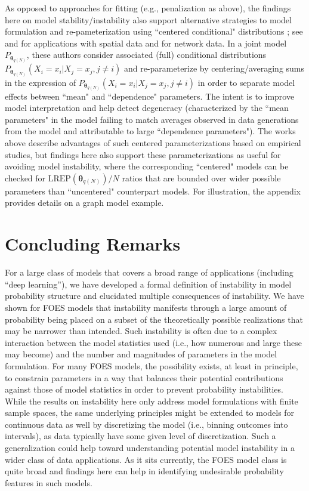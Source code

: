 \documentclass[numbib]{imamat}
\theoremstyle{theorem}
\theoremstyle{lemma}
\theoremstyle{example}
\theoremstyle{corollary}
\theoremstyle{definition}
\theoremstyle{remark}
\theoremstyle{approximation}
\theoremstyle{scheme}
\newcommand{\REP}{\mathrm{LREP}}
\newcommand{\thetaidx}{q(N)}
\newcommand{\thetaN}{\boldsymbol \theta_{\thetaidx}}
\newcommand{\ak}[1]{{\color{blue} #1}}
\begin{document}
{As opposed to approaches for fitting (e.g., penalization as above),  the findings here on model stability/instability also support alternative strategies to model formulation and re-pameterization using ``centered conditional" distributions \citep[cf.][]{kaiser2007statistical}; see \citet{kaiser2009exploring} and \citet{kaiser2012centered} for applications with spatial data and \citet{casleton2017local} for network data. In a joint model $P_{\thetaN}$,  these authors consider associated (full) conditional distributions $P_{\thetaN}(X_{i} = x_i | X_j=x_j, j\neq i)$ and re-parameterize by centering/averaging sums in the expression of  $P_{\thetaN}(X_{i} = x_i | X_j=x_j, j\neq i)$ in order to separate model effects between ``mean" and ``dependence" parameters.  The intent is to improve model interpretation and help detect degeneracy (characterized by the ``mean parameters" in the model failing to match averages observed in data generations from the model and attributable to large ``dependence parameters"). The works above describe advantages of such centered parameterizations based on empirical studies, but findings here also support these parameterizations as useful for avoiding model instability, where the corresponding ``centered" models can be checked for $\REP(\thetaN)/N$ ratios that are bounded over wider possible parameters than ``uncentered" counterpart models.  For illustration, the appendix provides details on a graph model example.}

\hypertarget{conclusions}{%
\section{Concluding Remarks}\label{conclusions}}

For a large class of models that covers a broad range of applications (including ``deep learning''), we have developed a formal definition of instability in model probability structure and elucidated multiple consequences of instability. We have shown for FOES models that instability manifests through \ak{a large amount of probability being placed on a subset of the theoretically possible realizations that may be narrower than intended.}
Such instability is often due to a complex interaction between the model statistics used (i.e., how numerous and large these may become) and the number and magnitudes of parameters in the model formulation. For many FOES models, the possibility exists, at least in principle, to \ak{constrain} parameters in a way \ak{that} balances their potential contributions against those of model statistics in order to prevent probability instabilities. \ak{While the results on instability here only address model formulations with finite sample spaces, the same underlying principles might be extended to models for continuous data as well by discretizing the model (i.e., binning outcomes into intervals), as data typically have some given level of discretization. Such a generalization could help toward understanding potential model instability in a wider class of data applications. As it sits currently, t}he FOES model class is quite broad and \ak{findings here can help in identifying undesirable probability features in such models.}
\end{document}
